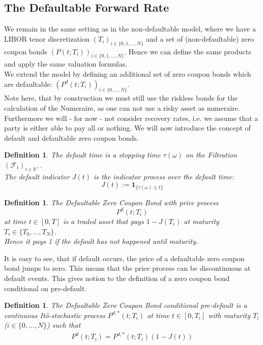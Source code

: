 \documentclass[12pt]{article}
\newtheorem{definition}[theorem]{Definition}
\begin{document}
	\subsection{The Defaultable Forward Rate}
		We remain in the same setting as in the non-defaultable model, where we have a LIBOR tenor discretization \((T_i)_{i\in\{0, 1, ..., N\}}\) and a set of (non-defaultable) zero coupon bonds \((P(t;T_i))_{i\in\{0, 1, ..., N\}}\). Hence we can define the same products and apply the same valuation formulas.\\
		We extend the model by defining an additional set of zero coupon bonds which are defaultable: \((P^d(t;T_i))_{i\in\{0, ..., N\}}\).\\
		Note here, that by construction we must still use the riskless bonds for the calculation of the Numeraire, as one can not use a risky asset as numeraire.
		Furthermore we will \color{red}- for now - \color{black} not consider recovery rates, i.e. we assume that a party is either able to pay all or nothing.
		We will now introduce the concept of default and defaultable zero coupon bonds.
	\begin{definition}
		The \emph{default time} is a stopping time \(\tau(\omega)\) on the Filtration \((\mathcal{F}_t)_{t\in \mathbb{R}^+}\).\\
		The \emph{default indicator} \(J(t)\) is the indicator process over the default time:
		\[J(t) := \mathbf{1}_{\{\tau(\omega) \le t\}}\]
	\end{definition}
	\begin{definition}
		The \emph{Defaultable Zero Coupon Bond} with price process \[P^d(t; T_i)\] at time \(t \in \left[0, T\right]\) is a traded asset that pays \(1 - J(T_i)\) at maturity  \(T_i \in \{T_0, ..., T_N\}\).\\
		Hence it pays 1 if the default has not happened until maturity. 
	\end{definition}
	It is easy to see, that if default occurs, the price of a defaultable zero coupon bond jumps to zero. This means that the price process can be discontinuous at default events. This gives notion to the definition of a zero coupon bond conditional on pre-default.
	\begin{definition}
		The \emph{Defaultable Zero Coupon Bond conditional pre-default} is a continuous Itô-stochastic process \(P^{d,*}(t; T_i)\) at time \(t \in \left[0, T_i\right]\) with maturity $T_i$ ($i \in \{0, ..., N\}$) such that
		\begin{align*}
			P^{d}(t; T_i) = P^{d,*}(t; T_i)(1 - J(t))
		\end{align*}
	\end{definition}
\end{document}
